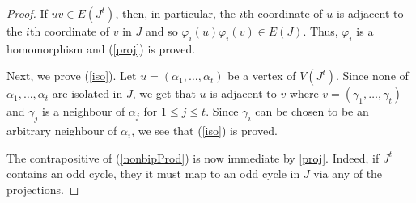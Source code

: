 \documentclass[11 pt]{amsart}
\theoremstyle{definition}
\theoremstyle{case}
\numberwithin{equation}{section}
\newcommand{\lcm}{\operatorname{lcm}}
\begin{document}
\begin{proof}
If $uv\in E(J^t)$, then, in particular, the $i$th coordinate of $u$ is adjacent to the $i$th coordinate of $v$ in $J$ and so $\varphi_i(u)\varphi_i(v)\in E(J)$. Thus, $\varphi_i$ is a homomorphism and (\ref{proj}) is proved.

Next, we prove (\ref{iso}). Let $u=(\alpha_1,\dots,\alpha_t)$ be a vertex of $V(J^t)$. Since none of $\alpha_1,\dots,\alpha_t$ are isolated in $J$, we get that $u$ is adjacent to $v$ where $v = (\gamma_1,\dots,\gamma_t)$ and $\gamma_j$ is a neighbour of $\alpha_j$ for $1\leq j\leq t$. Since $\gamma_i$ can be chosen to be an arbitrary neighbour of $\alpha_i$, we see that (\ref{iso}) is proved. 

The contrapositive of (\ref{nonbipProd}) is now immediate by \eqref{proj}.
Indeed, if $J^t$ contains an odd cycle, they it must map to an odd cycle in $J$ via any of the
projections.

%
%
\end{proof}
\end{document}
